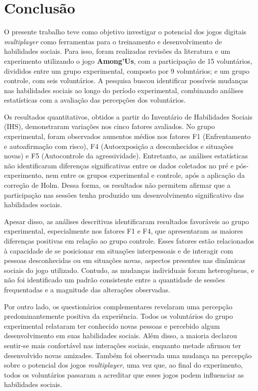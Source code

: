 \chapter{Conclusão}

O presente trabalho teve como objetivo investigar o potencial dos jogos digitais \textit{multiplayer} como ferramentas para o treinamento e desenvolvimento de habilidades sociais. Para isso, foram realizadas revisões da literatura e um experimento utilizando o jogo \textbf{Among’Us}, com a participação de 15 voluntários, divididos entre um grupo experimental, composto por 9 voluntários; e um grupo controle, com seis voluntários. A pesquisa buscou identificar possíveis mudanças nas habilidades sociais ao longo do período experimental, combinando análises estatísticas com a avaliação das percepções dos voluntários.

Os resultados quantitativos, obtidos a partir do Inventário de Habilidades Sociais (IHS), demonstraram variações nos cinco fatores avaliados. No grupo experimental, foram observados aumentos médios nos fatores F1 (Enfrentamento e autoafirmação com risco), F4 (Autoexposição a desconhecidos e situações novas) e F5 (Autocontrole da agressividade). Entretanto, as análises estatísticas não identificaram diferenças significativas entre os dados coletados no pré e pós-experimento, nem entre os grupos experimental e controle, após a aplicação da correção de Holm. Dessa forma, os resultados não permitem afirmar que a participação nas sessões tenha produzido um desenvolvimento significativo das habilidades sociais.

Apesar disso, as análises descritivas identificaram resultados favoráveis ao grupo experimental, especialmente nos fatores F1 e F4, que apresentaram as maiores diferenças positivas em relação ao grupo controle. Esses fatores estão relacionados à capacidade de se posicionar em situações interpessoais e de interagir com pessoas desconhecidas ou em situações novas, aspectos presentes nas dinâmicas sociais do jogo utilizado. Contudo, as mudanças individuais foram heterogêneas, e não foi identificado um padrão consistente entre a quantidade de sessões frequentadas e a magnitude das alterações observadas.

Por outro lado, os questionários complementares revelaram uma percepção predominantemente positiva da experiência. Todos os voluntários do grupo experimental relataram ter conhecido novas pessoas e percebido algum desenvolvimento em suas habilidades sociais. Além disso, a maioria declarou sentir-se mais confortável nas interações sociais, enquanto metade afirmou ter desenvolvido novas amizades. Também foi observada uma mudança na percepção sobre o potencial dos jogos \textit{multiplayer}, uma vez que, ao final do experimento, todos os voluntários passaram a acreditar que esses jogos podem influenciar as habilidades sociais.

